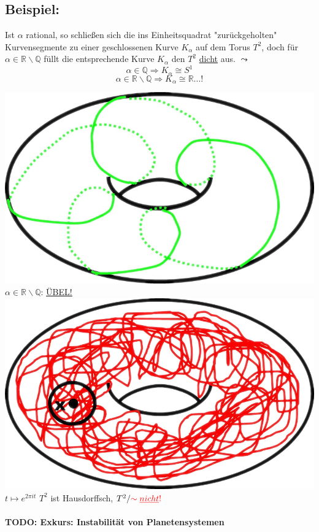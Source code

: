 \documentclass[a4paper,11pt,notitlepage]{report}
\theoremstyle{definition}
\newcommand{\R}{{\ensuremath{\mathbb{R}}}}
\newcommand{\Q}{{\ensuremath{\mathbb{Q}}}}
\newenvironment{bsp}[1]
{
\setlength{\fboxsep}{10pt}
\subsection*{Beispiel: #1}
\begin{upshape}
}
{
\end{upshape}
}
\begin{document}
\begin{bsp}{}
	Ist $\alpha$ rational, so schließen sich die ins Einheitsquadrat "zurückgeholten" Kurvensegmente zu einer geschlossenen Kurve $K_\alpha$ auf dem Torus $T^2$, doch für $\alpha \in \R \backslash \Q$ füllt die entsprechende Kurve $K_\alpha$ den $T^2$ \underline{dicht} aus. $\leadsto$
	$$\alpha \in \Q \Rightarrow K_\alpha \cong S^1$$
	$$\alpha \in \R \backslash \Q \Rightarrow K_\alpha \cong \R \ldots !$$	
	
	\includegraphics[scale=0.6]{images/Linien_Torus_rational.png}
	\newline
	$\alpha \in \R \backslash \Q$: \underline{\underline{ÜBEL!}}\newline
	\includegraphics[scale=0.6]{images/Linien_Torus_irrational.png}
	\newline
	$t \mapsto e^{2 \pi i t}$
	\newline
	$T^2$ ist Hausdorffsch, $T^2/\textcolor{red}{\sim \underline{nicht}!}$
\end{bsp}

\paragraph{TODO: Exkurs: Instabilität von Planetensystemen}
\end{document}
